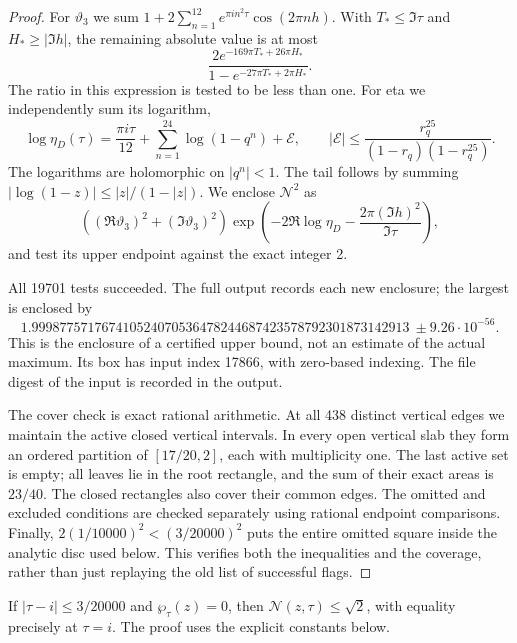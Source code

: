 \begin{proof}
For $\vartheta_3$ we sum
$1+2\sum_{n=1}^{12}e^{\pi i n^2\tau}\cos(2\pi nh)$.
With $T_*\leq\Im\tau$ and $H_*\geq|\Im h|$, the remaining
absolute value is at most
\[
 \frac{2e^{-169\pi T_*+26\pi H_*}}
 {1-e^{-27\pi T_*+2\pi H_*}}.
\]
The ratio in this expression is tested to be less than one. For eta
we independently sum its logarithm,
\[
 \log\eta_D(\tau)=\frac{\pi i\tau}{12}
          +\sum_{n=1}^{24}\log(1-q^n)+\mathcal E,
 \qquad
 |\mathcal E|\leq
 \frac{r_q^{25}}{(1-r_q)(1-r_q^{25})}.
\]
The logarithms are holomorphic on $|q^n|<1$. The tail follows by
summing $|\log(1-z)|\leq|z|/(1-|z|)$.
We enclose $\mathcal N^2$ as
\[
 ((\Re\vartheta_3)^2+(\Im\vartheta_3)^2)
 \exp\left(-2\Re\log\eta_D-
                   \frac{2\pi(\Im h)^2}{\Im\tau}\right),
\]
and test its upper endpoint against the exact integer 2.

All 19701 tests succeeded. The full output records each new enclosure;
the largest is enclosed by
\[
 1.999877571767410524070536478244687423578792301873142913
       \ \pm 9.26\cdot10^{-56}.
\]
This is the enclosure of a certified upper bound, not an estimate of
the actual maximum. Its box has input index 17866, with zero-based
indexing. The file digest of the input is recorded in the output.

The cover check is exact rational arithmetic. At all 438 distinct
vertical edges we maintain the active closed vertical intervals. In
every open vertical slab they form an ordered partition of
$[17/20,2]$, each with multiplicity one. The last active set is empty;
all leaves lie in the root rectangle, and the sum of their exact areas
is $23/40$. The closed rectangles also cover their common edges.
The omitted and excluded conditions are checked separately using
rational endpoint comparisons. Finally,
$2(1/10000)^2<(3/20000)^2$ puts the entire omitted square inside the
analytic disc used below. This verifies both the inequalities and
the coverage, rather than just replaying the old list of successful
flags.
\end{proof}

\begin{theorem}\label{push:src:E.4.2}
If $|\tau-i|\leq3/20000$ and $\wp_\tau(z)=0$, then
$\mathcal N(z,\tau)\leq\sqrt2$, with equality precisely at
$\tau=i$. The proof uses the explicit constants below.
\end{theorem}


